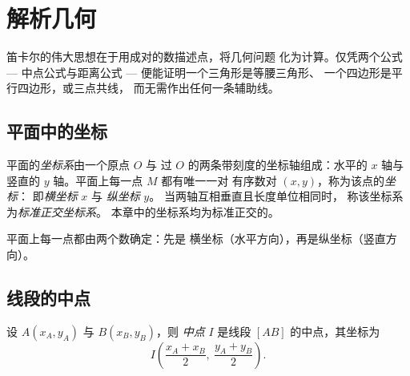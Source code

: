 \chapter{解析几何}\label{ch:g10:coordgeom}

笛卡尔的伟大思想在于用成对的数描述点，将几何问题
化为计算。仅凭两个公式 ---
中点公式与距离公式 --- 便能证明一个三角形是等腰三角形、
一个四边形是平行四边形，或三点共线，
而无需作出任何一条辅助线。

\section{平面中的坐标}

\begin{definition}[坐标系]\label{def:g10:coordgeom:system}
平面的\emph{坐标系}由一个原点 $O$ 与
过 $O$ 的两条带刻度的坐标轴组成：水平的
$x$ 轴与竖直的 $y$ 轴。平面上每一点 $M$ 都有唯一一对
有序数对 $(x, y)$，称为该点的\emph{坐标}：
即\emph{横坐标} $x$ 与
\emph{纵坐标} $y$。
当两轴互相垂直且长度单位相同时，
称该坐标系为\emph{标准正交坐标系}。
本章中的坐标系均为标准正交的。
\end{definition}

\begin{omfigure}

{\small 平面上每一点都由两个数确定：先是
横坐标（水平方向），再是纵坐标（竖直方向）。}
\end{omfigure}

\section{线段的中点}

\begin{proposition}[中点公式]\label{prop:g10:coordgeom:midpoint}
设 $A(x_A, y_A)$ 与 $B(x_B, y_B)$，则
\emph{中点} $I$ 是线段 $[AB]$ 的中点，其坐标为
\[
I\left(\frac{x_A + x_B}{2},\ \frac{y_A + y_B}{2}\right).
\]
\end{proposition}

